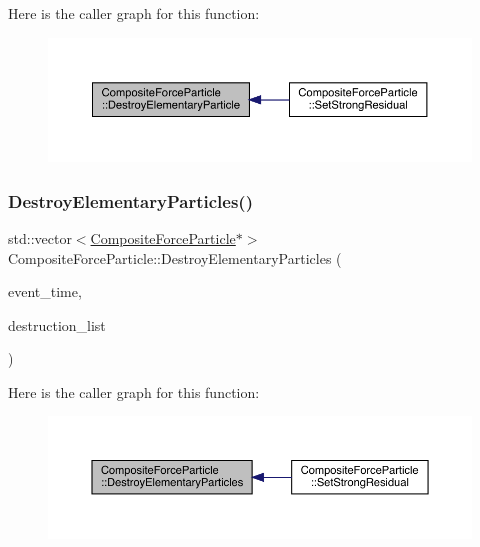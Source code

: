Here is the caller graph for this function\+:\nopagebreak
\begin{figure}[H]
\begin{center}
\leavevmode
\includegraphics[width=350pt]{class_composite_force_particle_ac176d2e41d75e308d4b510f3338d8b9e_icgraph}
\end{center}
\end{figure}
\mbox{\label{class_composite_force_particle_a602ef5e477db576e47c36436b83f80f5}} 
\subsubsection{\texorpdfstring{Destroy\+Elementary\+Particles()}{DestroyElementaryParticles()}}
{\footnotesize\ttfamily std\+::vector$<$\hyperlink{class_composite_force_particle}{Composite\+Force\+Particle}$\ast$$>$ Composite\+Force\+Particle\+::\+Destroy\+Elementary\+Particles (\begin{DoxyParamCaption}\item[{std\+::chrono\+::time\+\_\+point$<$ \hyperlink{universe_8h_a0ef8d951d1ca5ab3cfaf7ab4c7a6fd80}{Clock} $>$}]{event\+\_\+time,  }\item[{std\+::vector$<$ \hyperlink{class_composite_force_particle}{Composite\+Force\+Particle} $\ast$$>$}]{destruction\+\_\+list }\end{DoxyParamCaption})}

Here is the caller graph for this function\+:\nopagebreak
\begin{figure}[H]
\begin{center}
\leavevmode
\includegraphics[width=350pt]{class_composite_force_particle_a602ef5e477db576e47c36436b83f80f5_icgraph}
\end{center}
\end{figure}
\mbox{\label{class_composite_force_particle_ae0bc57309f04b784b2c23b82db869b25}} 
